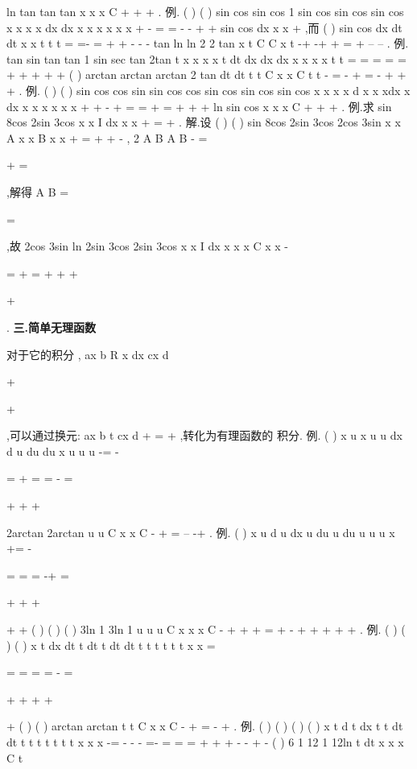 \int 
\int 
\int 
ln tan
tan
tan
x
x
x
C
+
+
+
. 
\textcolor{lyred}{例}.
(
)
(
)
sin
cos
sin cos
1 sin
cos
sin
cos
sin
cos
x
x
x
x dx
dx
x
x
x
x
x
x
+
-
=
=
-
-
+
+
\int 
\int 
sin
cos
dx
x
x
+
\int 
,而
(
)
sin
cos
dx
dt
dt
x
x
t
t
t
=
=-
=
+
+
-
-
-
\int 
\int 
\int 
tan
ln
ln
2 2
tan
x
t
C
C
x
t
-+
-+
+
=
+
--
--
. 
\textcolor{lyred}{例}.
tan
sin
tan
tan
1 sin
sec
tan
2tan
t
x
x
x
x
t
dt
dx
dx
dx
x
x
x
x
t
t
=
=
=
=
\cdots 
=
+
+
+
+
+
\int 
\int 
\int 
\int 
(
)
arctan
arctan
arctan
2 tan
dt
dt
t
t
C
x
x
C
t
t
-
=
-
+
=
-
+
+
+
\int 
\int 
. 
\textcolor{lyred}{例}.
(
)
(
)
sin
cos
cos
sin
sin
cos
cos
sin
cos
sin
cos
sin
cos
x
x
x
x
d
x
x
xdx
x
dx
x
x
x
x
x
x
+
+
-
+
=
=
+
=
+
+
+
\int 
\int 
\int 
ln sin
cos
x
x
x
C
+
+
+
. 
\textcolor{lyred}{例}.求
sin
8cos
2sin
3cos
x
x
I
dx
x
x
+
=
+
\int 
. 
解.设
(
)
(
)
sin
8cos
2sin
3cos
2cos
3sin
x
x
A
x
x
B
x
x
+
=
+
+
-
, 2
A
B
A
B
-
=


+
=

,解得 
A
B
=


=

,故
2cos
3sin
ln 2sin
3cos
2sin
3cos
x
x
I
dx
x
x
x
C
x
x
-


=
+
=
+
+
+


+


\int 
. 
\vspace{4pt}
{\bfseries \textcolor{lyred}{三.简单无理函数}}

对于它的积分
,
ax
b
R x
dx
cx
d


+




+


\int 
,可以通过换元:
ax
b
t
cx
d
+
=
+
,转化为有理函数的 
积分. 
\textcolor{lyred}{例}.
(
)
x
u
x
u
u
dx
d u
du
du
x
u
u
u
-=
-


=
+
=
=
-
=


+
+
+


\int 
\int 
\int 
\int 
2arctan
2arctan
u
u
C
x
x
C
-
+
=
--
-+
. 
\textcolor{lyred}{例}.
(
)
x
u
d u
dx
u du
u
du
u
u
u
x
+=
-


=
=
=
-+
=


+
+
+


+
+
\int 
\int 
\int 
\int 
(
)
(
)
(
)
3ln 1
3ln 1
u
u
u
C
x
x
x
C
-
+
+
+
=
+
-
+
+
+
+
+
. 
\textcolor{lyred}{例}.
(
)
(
)
(
)
x t
dx
dt
t dt
t
dt
dt
t
t
t
t
t
t
x
x
=


=
=
=
=
-
=


+
+
+
+


+
\int 
\int 
\int 
\int 
\int 
(
)
(
)
arctan
arctan
t
t
C
x
x
C
-
+
=
-
+
. 
\textcolor{lyred}{例}.
(
)
(
)
(
)
(
)
x t
d
t
dx
t
t
dt
dt
t
t
t
t
t
t
t
x
x
x
-=
-
-
-
=-
=
=
=
+
+
+
-
-
+
-
\int 
\int 
\int 
\int 
(
)
6 1
12 1
12ln
t
dt
x
x
x
C
t


